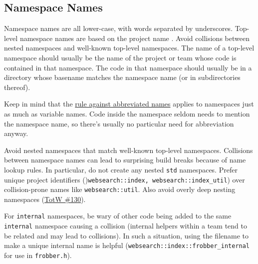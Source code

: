     \subsection{Namespace Names}\label{subsec:namespace-names}
    Namespace names are all lower-case, with words separated by underscores. Top-level namespace names are based on the project name . Avoid collisions between nested namespaces and well-known top-level namespaces.
    The name of a top-level namespace should usually be the name of the project or team whose code is contained in that namespace. The code in that namespace should usually be in a directory whose basename matches the namespace name (or in subdirectories thereof).

    Keep in mind that the \hyperref[sec:general-naming-rules]{rule against abbreviated names} applies to namespaces just as much as variable names. Code inside the namespace seldom needs to mention the namespace name, so there's usually no particular need for abbreviation anyway.

    Avoid nested namespaces that match well-known top-level namespaces. Collisions between namespace names can lead to surprising build breaks because of name lookup rules. In particular, do not create any nested \texttt{std} namespaces. Prefer unique project identifiers ()\texttt{websearch::index, websearch::index_util}) over collision-prone names like \texttt{websearch::util}. Also avoid overly deep nesting namespaces (\hyperref[ch:tip-of-the-week-130]{TotW \#130}).

    For \texttt{internal} namespaces, be wary of other code being added to the same \texttt{internal} namespace causing a collision (internal helpers within a team tend to be related and may lead to collisions). In such a situation, using the filename to make a unique internal name is helpful (\texttt{websearch::index::frobber_internal} for use in \texttt{frobber.h}).
